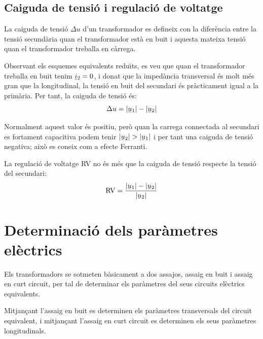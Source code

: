 \subsection{Caiguda de tensi\'{o} i regulaci\'{o} de voltatge}

La caiguda de tensi\'{o} $\Delta u$ d'un transformador  es defineix con la difer\`{e}ncia entre la tensi\'{o} secund\`{a}ria quan el transformador est\`{a} en buit i aquesta mateixa tensi\'{o} quan el transformador treballa en c\`{a}rrega.

Observant els esquemes equivalents redu\"{\i}ts, es veu que quan el transformador treballa en buit tenim $\cmplx{i}_2=0$, i donat que la imped\`{a}ncia transversal \'{e}s molt m\'{e}s gran que la longitudinal, la tensi\'{o} en buit del secundari \'{e}s pr\`{a}cticament igual a la prim\`{a}ria. Per tant, la caiguda de tensi\'{o} \'{e}s:
\begin{equation}
    \Delta u = |\cmplx{u}_1| - |\cmplx{u}_2|
\end{equation}

Normalment aquest valor \'{e}s positiu, per\`{o} quan la carrega connectada al secundari es fortament capacitiva podem tenir  $|\cmplx{u}_2| > |\cmplx{u}_1|$ i per tant una caiguda de tensi\'{o} negativa; aix\`{o} es coneix com a efecte Ferranti.

La regulaci\'{o} de voltatge RV no \'{e}s m\'{e}s que la caiguda de tensi\'{o} respecte la tensi\'{o} del secundari:
\begin{equation}
    \text{RV} = \frac{|\cmplx{u}_1| - |\cmplx{u}_2|}{|\cmplx{u}_2|}
\end{equation}

\section{Determinaci\'{o} dels par\`{a}metres el\`{e}ctrics}\label{sec:determ-param-trafo}

Els transformadors se sotmeten b\`{a}sicament a dos assajos, assaig en
buit i assaig en curt circuit, per tal de determinar els par\`{a}metres
del seus circuits el\`{e}ctrics equivalents.

Mitjan\c{c}ant l'assaig en buit es determinen els par\`{a}metres
transversals del circuit equivalent, i mitjan\c{c}ant l'assaig en curt
circuit es determinen els seus par\`{a}metres longitudinals.

